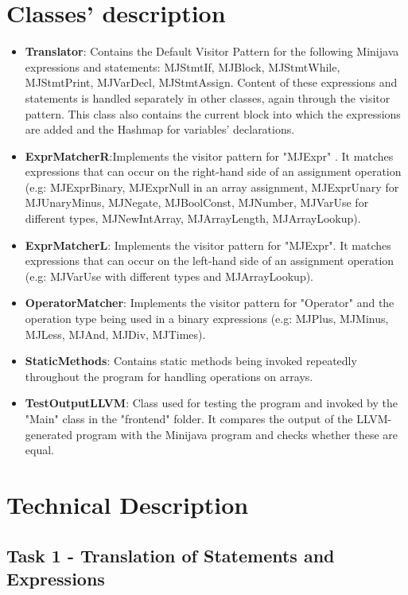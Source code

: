 \documentclass[paper=a4, fontsize=11pt]{scrartcl}
\numberwithin{equation}{section}		%
\numberwithin{figure}{section}			%
\numberwithin{table}{section}				%
\begin{document}
\section*{Classes' description}
\begin{itemize}
	\item \textbf{Translator}: Contains the Default Visitor Pattern for the following  Minijava expressions and statements: MJStmtIf, MJBlock, MJStmtWhile, MJStmtPrint, MJVarDecl, MJStmtAssign. Content of these expressions and statements is handled separately in other classes, again through the visitor pattern. This class also contains the current block into which the expressions are added and the Hashmap for variables' declarations.
	\item \textbf{ExprMatcherR}:Implements the visitor pattern for "MJExpr" . It matches expressions that can occur on the right-hand side of an assignment operation (e.g: MJExprBinary, MJExprNull in an array assignment, MJExprUnary for MJUnaryMinus, MJNegate, MJBoolConst, MJNumber, MJVarUse for different types, MJNewIntArray, MJArrayLength, MJArrayLookup). 
	\item \textbf{ExprMatcherL}: Implements the visitor pattern for "MJExpr". It matches expressions that can occur on the left-hand side of an assignment operation (e.g: MJVarUse with different types and MJArrayLookup). 
	\item \textbf{OperatorMatcher}: Implements the visitor pattern for "Operator" and the operation type being used in a binary expressions (e.g: MJPlus, MJMinus, MJLess, MJAnd, MJDiv, MJTimes). 
	\item \textbf{StaticMethods}: Contains static methods being invoked repeatedly throughout the program for handling operations on arrays. 
	\item \textbf{TestOutputLLVM}: Class used for testing the program and invoked by the "Main" class in the "frontend" folder. It compares the output of the LLVM-generated program with the Minijava program and checks whether these are equal. 
\end{itemize}

\section*{Technical Description}

\subsection*{Task 1 - Translation of Statements and Expressions}
\end{document}
